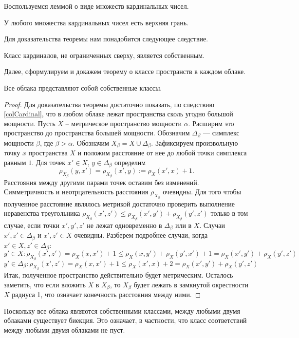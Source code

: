 \documentclass[11pt,twoside,draft
]{article}
\begin{document}
Воспользуемся леммой о виде множеств кардинальных чисел.
\begin{lemma}
	У любого множества кардинальных чисел есть верхняя грань.
\end{lemma}
Для доказательства теоремы нам понадобится следующее следствие.
\begin{corollary}
	Класс кардиналов, не ограниченных сверху, является собственным.
	\label{colCardinal}
\end{corollary}
Далее, сформулируем и докажем теорему о классе пространств в каждом облаке.
\begin{theorem} Все облака представляют собой собственные классы.
\end{theorem}
\begin{proof} Для доказательства теоремы достаточно показать, по следствию \ref{colCardinal}, что в любом
	облаке лежат пространства сколь угодно большой мощности.  Пусть $X$ --
	метрическое пространство мощности $\alpha$. Расширим это пространство до
	пространства большей мощности. Обозначим $\Delta_\beta$ --- симплекс мощности
	$\beta$, где $\beta > \alpha$. Обозначим $X_\beta = X \cup \Delta_\beta$.
	Зафиксируем произвольную точку $x$ пространства $X$ и положим расстояние от нее
	до любой точки симплекса равным $1$. Для точек $x' \in X$,
	$y \in \Delta_\beta$ определим
	$$\rho_{X_\beta}(y,x') = \rho_{X_\beta}(x',y) := \rho_X(x',x) + 1.$$
	Расстояния между другими парами точек оставим без изменений.
	Симметричность и неотрцательность расстояния $\rho_{X_{\beta}}$ очевидны.
	Для того чтобы
	полученное расстояние являлось метрикой достаточно проверить выполнение
	неравенства треугольника
	$\rho_{X_\beta}(x',z') \le \rho_{X_\beta}(x',y') +\rho_{X_\beta}(y',z')$
	только в том случае, если точки $x', y', z'$ не лежат одновременно в
	$\Delta_\beta$ или в $X$. Случаи $x', z' \in \Delta_\beta$ и $ x', z' \in X$
	очевидны. Разберем подробнее случаи, когда $x' \in X, z' \in \Delta_\beta$:
	$$ y' \in X: \rho_{X_\beta}(x', z') = \rho_X(x,x') + 1 \le \rho_X(x,y') + \rho_X(y',x') + 1 = \rho_X(x',y') + \rho_X(y',z')$$
	$$y' \in \Delta_\beta: \rho_{X_\beta}(x', z') = \rho_X(x,x') + 1 \le \rho_X(x',x) + 2 = \rho_X(x',y') + \rho_X(y',z')$$
	Итак, полученное пространство действительно будет метрическим. Осталось
	заметить, что если вложить $X$ в $X_\beta$, то $X_\beta$ будет лежать в
	замкнутой окрестности $X$ радиуса 1, что означает конечность расстояния между
	ними.
\end{proof}

\begin{remark} Поскольку все облака являются собственными классами, между
	любыми двумя облаками существует биекция. Это означает, в частности, что класс соответствий между любыми двумя облаками не пуст.
\end{remark}
\end{document}
